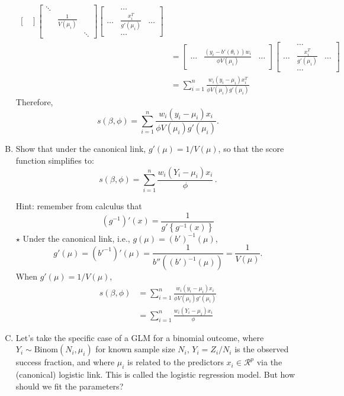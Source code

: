 \documentclass[11pt]{article}
\newcommand{\jie}{$\star$ }
\begin{document}
\begin{enumerate}[(A)]
\begin{align*}
\begin{bmatrix}
    \end{bmatrix}
    \begin{bmatrix}
      \ddots & & \\
      & \frac{1}{V(\mu_i)} & \\
      & & \ddots
    \end{bmatrix}
    \begin{bmatrix}
      & \dots & \\
    \dots & \frac{x_i^T}{g'(\mu_i)} & \dots \\
      & \dots &
    \end{bmatrix} \\
    &= 
    \begin{bmatrix}
     \dots & \frac{(y_i-b'(\theta_i))w_i}{\phi V(\mu_i)} & \dots
    \end{bmatrix}
    \begin{bmatrix}
      & \dots & \\
    \dots & \frac{x_i^T}{g'(\mu_i)} & \dots \\
      & \dots &
    \end{bmatrix} \\
    &= \sum_{i=1}^n \frac{w_i(y_i - \mu_i) x_i^T}{ \phi V(\mu_i) g'(\mu_i)}
\end{align*}
Therefore,
$$s(\beta, \phi) = \sum_{i=1}^n \frac{w_i(y_i - \mu_i) x_i}{ \phi V(\mu_i) g'(\mu_i)}.$$
\bigskip

\item Show that under the canonical link, $g'(\mu) = 1/V(\mu)$, so that the score function simplifies to:  
$$
s(\beta, \phi) = \sum_{i=1}^n \frac{w_i(Y_i - \mu_i) x_i}{ \phi} \, .
$$

Hint: remember from calculus that
$$
(g^{-1})'(x) = \frac{1}{g'\left\{ g^{-1}(x) \right\}}
$$
\bigskip
\jie 
Under the canonical link, i.e., $g(\mu) = (b')^{-1}(\mu)$, 
$$g'(\mu) = (b'^{-1})'(\mu) = \frac{1}{b''((b')^{-1}(\mu))} = \frac{1}{V(\mu)}. $$
When $g'(\mu) = 1/V(\mu)$,
\begin{align*}
    s(\beta, \phi) &= \sum_{i=1}^n \frac{w_i(y_i - \mu_i) x_i}{ \phi V(\mu_i) g'(\mu_i)} \\
    &= \sum_{i=1}^n \frac{w_i(Y_i - \mu_i) x_i}{ \phi}
\end{align*}

\item Let's take the specific case of a GLM for a binomial outcome, where $Y_i \sim \mbox{Binom}(N_i, \mu_i)$ for known sample size $N_i$, $Y_i = Z_i/N_i$ is the observed success fraction, and where $\mu_i$ is related to the predictors $x_i \in \mathcal{R}^p$ via the (canonical) logistic link.  This is called the logistic regression model.  But how should we fit the parameters?


\end{enumerate}
\end{document}
